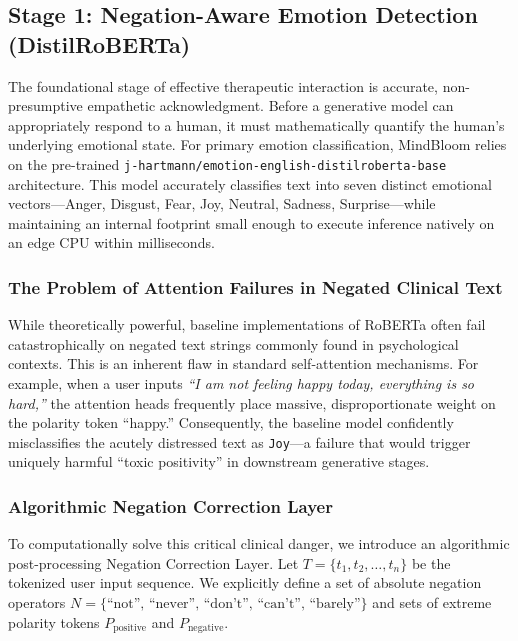 \documentclass[12pt,twoside]{article}
\begin{document}
\subsection{Stage 1: Negation-Aware Emotion Detection (DistilRoBERTa)}

The foundational stage of effective therapeutic interaction is accurate, non-presumptive empathetic acknowledgment. Before a generative model can appropriately respond to a human, it must mathematically quantify the human's underlying emotional state. For primary emotion classification, MindBloom relies on the pre-trained \texttt{j-hartmann/emotion-english-distilroberta-base} architecture. This model accurately classifies text into seven distinct emotional vectors---Anger, Disgust, Fear, Joy, Neutral, Sadness, Surprise---while maintaining an internal footprint small enough to execute inference natively on an edge CPU within milliseconds.

\subsubsection{The Problem of Attention Failures in Negated Clinical Text}

While theoretically powerful, baseline implementations of RoBERTa often fail catastrophically on negated text strings commonly found in psychological contexts. This is an inherent flaw in standard self-attention mechanisms. For example, when a user inputs \textit{``I am not feeling happy today, everything is so hard,''} the attention heads frequently place massive, disproportionate weight on the polarity token ``happy.'' Consequently, the baseline model confidently misclassifies the acutely distressed text as \texttt{Joy}---a failure that would trigger uniquely harmful ``toxic positivity'' in downstream generative stages.

\subsubsection{Algorithmic Negation Correction Layer}

To computationally solve this critical clinical danger, we introduce an algorithmic post-processing Negation Correction Layer. Let $T = \{t_1, t_2, \ldots, t_n\}$ be the tokenized user input sequence. We explicitly define a set of absolute negation operators $N = \{\text{``not'', ``never'', ``don't'', ``can't'', ``barely''}\}$ and sets of extreme polarity tokens $P_{\text{positive}}$ and $P_{\text{negative}}$.
\end{document}
